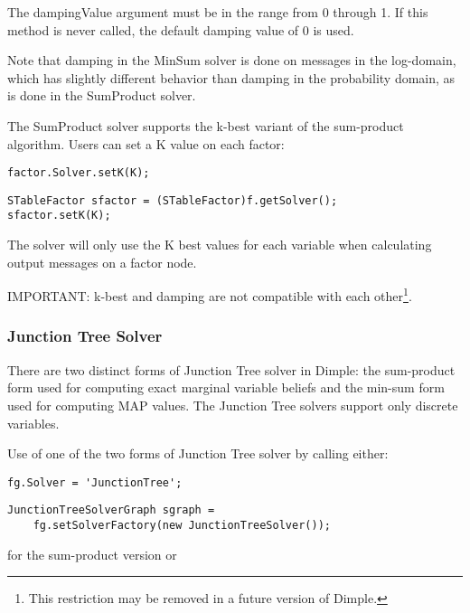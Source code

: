 The dampingValue argument must be in the range from 0 through 1.  If this method is never called, the default damping value of 0 is used.

Note that damping in the MinSum solver is done on messages in the log-domain, which has slightly different behavior than damping in the probability domain, as is done in the SumProduct solver.



The SumProduct solver supports the k-best variant of the sum-product algorithm.  Users can set a K value on each factor:

\ifmatlab
\begin{lstlisting}
factor.Solver.setK(K);
\end{lstlisting}
\fi

\ifjava
\begin{lstlisting}
STableFactor sfactor = (STableFactor)f.getSolver();
sfactor.setK(K);
\end{lstlisting}
\fi

The solver will only use the K best values for each variable when calculating output messages on a factor node.

IMPORTANT: k-best and damping are not compatible with each other\footnote{This restriction may be removed in a future version of Dimple.}.

\subsubsection{Junction Tree Solver}
\label{sec:JunctionTreeSolverAPI}

There are two distinct forms of Junction Tree solver in Dimple: the sum-product form used for computing exact marginal variable beliefs and the min-sum form used for computing MAP values.  The Junction Tree solvers support only discrete variables.

Use of one of the two forms of Junction Tree solver by calling either:

\ifmatlab
\begin{lstlisting}
fg.Solver = 'JunctionTree';
\end{lstlisting}
\fi

\ifjava
\begin{lstlisting}
JunctionTreeSolverGraph sgraph =
    fg.setSolverFactory(new JunctionTreeSolver());
\end{lstlisting}
\fi

for the sum-product version or

